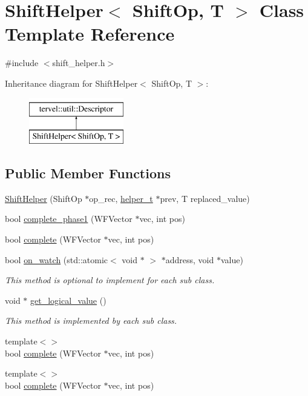 \hypertarget{class_shift_helper}{}\section{Shift\+Helper$<$ Shift\+Op, T $>$ Class Template Reference}
\label{class_shift_helper}


{\ttfamily \#include $<$shift\+\_\+helper.\+h$>$}

Inheritance diagram for Shift\+Helper$<$ Shift\+Op, T $>$\+:\begin{figure}[H]
\begin{center}
\leavevmode
\includegraphics[height=2.000000cm]{class_shift_helper}
\end{center}
\end{figure}
\subsection*{Public Member Functions}
\begin{DoxyCompactItemize}
\item 
\hyperlink{class_shift_helper_afe59d3f3c04ec220e27b4e105ef524ba}{Shift\+Helper} (Shift\+Op $\ast$op\+\_\+rec, \hyperlink{class_shift_helper_a4aef867507bfd1c5db6c66d3902c1ac4}{helper\+\_\+t} $\ast$prev, T replaced\+\_\+value)
\item 
bool \hyperlink{class_shift_helper_aff4a4245b9e9abd04924b5786a11f865}{complete\+\_\+phase1} (W\+F\+Vector $\ast$vec, int pos)
\item 
bool \hyperlink{class_shift_helper_a767a40e252dfebb4b281a6c10a079056}{complete} (W\+F\+Vector $\ast$vec, int pos)
\item 
bool \hyperlink{class_shift_helper_ad7f8e39f62c9646ec5862df3ee1e5ab4}{on\+\_\+watch} (std\+::atomic$<$ void $\ast$ $>$ $\ast$address, void $\ast$value)
\begin{DoxyCompactList}\small\item\em This method is optional to implement for each sub class. \end{DoxyCompactList}\item 
void $\ast$ \hyperlink{class_shift_helper_a4c58f2e7ae4ce7e86a38fea777b3ff2e}{get\+\_\+logical\+\_\+value} ()
\begin{DoxyCompactList}\small\item\em This method is implemented by each sub class. \end{DoxyCompactList}\item 
{\footnotesize template$<$$>$ }\\bool \hyperlink{class_shift_helper_a16fb2a9b85184a6df079d24be1fa407d}{complete} (W\+F\+Vector $\ast$vec, int pos)
\item 
{\footnotesize template$<$$>$ }\\bool \hyperlink{class_shift_helper_a08b8565cd212f551818204c94430d579}{complete} (W\+F\+Vector $\ast$vec, int pos)
\end{DoxyCompactItemize}
